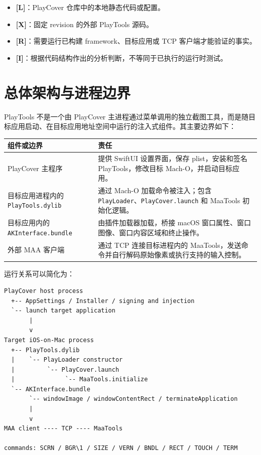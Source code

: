 \documentclass[UTF8,a4paper,11pt]{ctexart}
\newcommand{\localmark}{\textbf{[L]}}
\newcommand{\externalmark}{\textbf{[X]}}
\newcommand{\runtimeMark}{\textbf{[R]}}
\newcommand{\inferenceMark}{\textbf{[I]}}
\begin{document}
\begin{itemize}
  \item \localmark{}：PlayCover 仓库中的本地静态代码或配置。
  \item \externalmark{}：固定 revision 的外部 PlayTools 源码。
  \item \runtimeMark{}：需要运行已构建 framework、目标应用或 TCP 客户端才能验证的事实。
  \item \inferenceMark{}：根据代码结构作出的分析判断，不等同于已执行的运行时测试。
\end{itemize}

\section{总体架构与进程边界}

PlayTools 不是一个由 PlayCover 主进程通过菜单调用的独立截图工具，而是随目标应用启动、在目标应用地址空间中运行的注入式组件。其主要边界如下：

\begin{center}
\small
\begin{tabularx}{\textwidth}{>{\raggedright\arraybackslash}p{} X}
\toprule
组件或边界 & 责任 \\
\midrule
PlayCover 主程序 & 提供 SwiftUI 设置界面，保存 plist，安装和签名 PlayTools，修改目标 Mach-O，并启动目标应用。\\
目标应用进程内的 \texttt{PlayTools.dylib} & 通过 Mach-O 加载命令被注入；包含 \texttt{PlayLoader}、\texttt{PlayCover.launch} 和 MaaTools 初始化逻辑。\\
目标应用内的 \texttt{AKInterface.bundle} & 由插件加载器加载，桥接 macOS 窗口属性、窗口图像、窗口内容区域和终止操作。\\
外部 MAA 客户端 & 通过 TCP 连接目标进程内的 MaaTools，发送命令并自行解码原始像素或执行支持的输入控制。\\
\bottomrule
\end{tabularx}
\end{center}

\clearpage
\begin{samepage}
运行关系可以简化为：

\begin{lstlisting}
PlayCover host process
  +-- AppSettings / Installer / signing and injection
  `-- launch target application
       |
       v
Target iOS-on-Mac process
  +-- PlayTools.dylib
  |    `-- PlayLoader constructor
  |         `-- PlayCover.launch
  |              `-- MaaTools.initialize
  `-- AKInterface.bundle
       `-- windowImage / windowContentRect / terminateApplication
       |
       v
MAA client ---- TCP ---- MaaTools

commands: SCRN / BGR\1 / SIZE / VERN / BNDL / RECT / TOUCH / TERM
\end{lstlisting}
\end{samepage}
\end{document}
